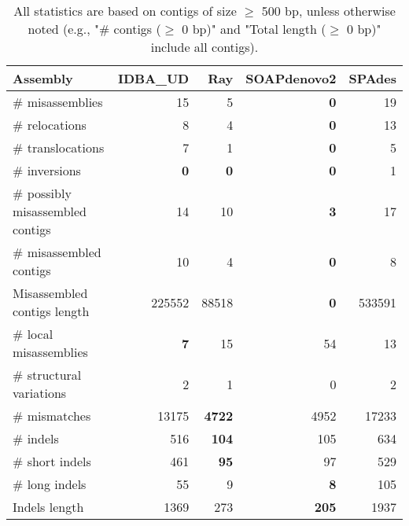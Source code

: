 \documentclass[12pt,a4paper]{article}
\begin{document}
\begin{table}[ht]
\begin{center}
\caption{All statistics are based on contigs of size $\geq$ 500 bp, unless otherwise noted (e.g., "\# contigs ($\geq$ 0 bp)" and "Total length ($\geq$ 0 bp)" include all contigs).}
\begin{tabular}{|l*{4}{|r}|}
\hline
Assembly & IDBA\_UD & Ray & SOAPdenovo2 & SPAdes \\ \hline
\# misassemblies & 15 & 5 & {\bf 0} & 19 \\ \hline
\hspace{5mm}\# relocations & 8 & 4 & {\bf 0} & 13 \\ \hline
\hspace{5mm}\# translocations & 7 & 1 & {\bf 0} & 5 \\ \hline
\hspace{5mm}\# inversions & {\bf 0} & {\bf 0} & {\bf 0} & 1 \\ \hline
\# possibly misassembled contigs & 14 & 10 & {\bf 3} & 17 \\ \hline
\# misassembled contigs & 10 & 4 & {\bf 0} & 8 \\ \hline
Misassembled contigs length & 225552 & 88518 & {\bf 0} & 533591 \\ \hline
\# local misassemblies & {\bf 7} & 15 & 54 & 13 \\ \hline
\# structural variations & 2 & 1 & 0 & 2 \\ \hline
\# mismatches & 13175 & {\bf 4722} & 4952 & 17233 \\ \hline
\# indels & 516 & {\bf 104} & 105 & 634 \\ \hline
\hspace{5mm}\# short indels & 461 & {\bf 95} & 97 & 529 \\ \hline
\hspace{5mm}\# long indels & 55 & 9 & {\bf 8} & 105 \\ \hline
Indels length & 1369 & 273 & {\bf 205} & 1937 \\ \hline
\end{tabular}
\end{center}
\end{table}
\end{document}
